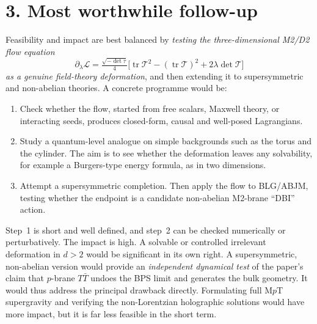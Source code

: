 \documentclass[11pt]{article}
\begin{document}
\section*{3. Most worthwhile follow-up}
Feasibility and impact are best balanced by \emph{testing the three-dimensional
M2/D2 flow equation}
\[
\partial_\lambda\mathcal L=\tfrac{\sqrt{-\det\tau}}{4}\bigl[\operatorname{tr}\mathcal
T^2-(\operatorname{tr}\mathcal T)^2+2\lambda\det\mathcal T\bigr]
\]
\emph{as a genuine field-theory deformation}, and then extending it to supersymmetric and
non-abelian theories. A concrete programme would be:
\begin{enumerate}
\item Check whether the flow, started from free scalars, Maxwell theory, or interacting
seeds, produces closed-form, causal and well-posed Lagrangians.
\item Study a quantum-level analogue on simple backgrounds such as the torus and the
cylinder. The aim is to see whether the deformation leaves any solvability, for example
a Burgers-type energy formula, as in two dimensions.
\item Attempt a supersymmetric completion. Then apply the flow to BLG/ABJM, testing
whether the endpoint is a candidate non-abelian M2-brane ``DBI'' action.
\end{enumerate}
Step~1 is short and well defined, and step~2 can be checked numerically or perturbatively.
The impact is high. A solvable or controlled irrelevant deformation in $d>2$ would be
significant in its own right. A supersymmetric, non-abelian version would provide an
\emph{independent dynamical test} of the paper's claim that $p$-brane $T\bar T$ undoes
the BPS limit and generates the bulk geometry. It would thus address the principal
drawback directly. Formulating full M$p$T supergravity and verifying the non-Lorentzian
holographic solutions would have more impact, but it is far less feasible in the short
term.
\end{document}
